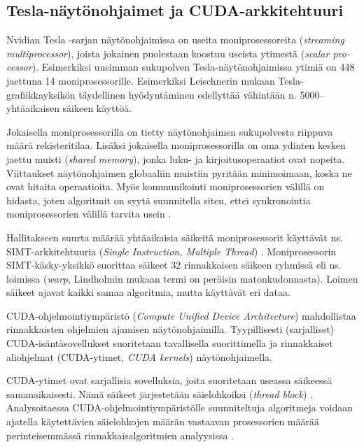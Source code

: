 \documentclass[a4paper,11pt]{article}
\newcommand{\engl}[1]{\foreignlanguage{english}{\em #1}}
\begin{document}
\subsection{Tesla-näytönohjaimet ja CUDA-arkkitehtuuri}

Nvidian Tesla -sarjan näytönohjaimissa on useita moniprosessoreita (\engl{streaming multiprocessor}), joista jokainen puolestaan koostuu useista ytimestä (\engl{scalar processor}). Esimerkiksi uusimman sukupolven Tes\-la-näy\-tön\-oh\-jai\-mis\-sa ytimiä on 448 jaettuna 14 moniprosessorille. Esimerkiksi Leischnerin \cite{leischner2010} mukaan Tesla-gra\-fiik\-ka\-yk\-si\-kön täydellinen hyödyntäminen edellyttää vähintään n. 5000\thinspace-- yhtäaikaisen säikeen käyttöä.

Jokaisella moniprosessorilla on tietty näytönohjaimen sukupolvesta riippuva määrä rekisteritilaa. Lisäksi jokaisella moniprosessorilla on oma ydinten kesken jaettu muisti (\engl{shared memory}), jonka luku- ja kirjoitusoperaatiot ovat nopeita. Viittaukset näytönohjaimen globaaliin muistiin pyritään minimoimaan, koska ne ovat hitaita operaatioita. Myös kommunikointi moniprosessorien välillä on hidasta, joten algoritmit on syytä suunnitella siten, ettei synkronointia moniprosessorien välillä tarvita usein \cite{kolonias2011}.

Hallitakseen suurta määrää yhtäaikaisia säikeitä moniprosessorit käyttävät ns. SIMT-arkkitehtuuria (\engl{Single Instruction, Multiple Thread}) \cite{lindholm2008}. Moniprosessorin SIMT-käsky-yksikkö suorittaa säikeet 32 rinnakkaisen säikeen ryhmissä eli ns. loimissa (\engl{warp}, Lindholmin \cite{lindholm2008} mukaan termi on peräisin matonkudonnasta). Loimen säikeet ajavat kaikki samaa algoritmia, mutta käyttävät eri dataa.

CUDA-ohjelmointiympäristö (\engl{Compute Unified Device Architecture}) \cite{cudaprogramming} mahdollistaa rinnakkaisten ohjelmien ajamisen näytönohjaimilla. Tyypillisesti (sarjalliset) CUDA-isäntäsovellukset suoritetaan tavallisella suorittimella ja rinnakkaiset aliohjelmat (CUDA-ytimet, \engl{CUDA kernels}) näytönohjaimella.

CUDA-ytimet ovat sarjallisia sovelluksia, joita suoritetaan useassa säikeessä samanaikaisesti. Nämä säikeet järjestetään säielohkoiksi (\engl{thread block}) \cite{cudaprogramming}. Analysoitaessa CUDA-ohjelmointiympäristölle suunniteltuja algoritmeja voidaan ajatella käytettävien säielohkojen määrän vastaavan prosessorien määrää perinteisemmässä rinnakkaisalgoritmien analyysissa \cite{satish2009}.
\end{document}
